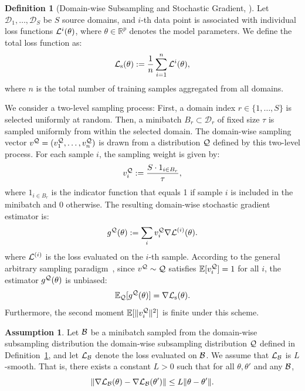 \documentclass{article}
\theoremstyle{plain}
\theoremstyle{definition}
\newtheorem{definition}[theorem]{Definition}
\newtheorem{assumption}[theorem]{Assumption}
\theoremstyle{remark}
\begin{document}
\begin{definition}[Domain-wise Subsampling and Stochastic Gradient, \cite{gower2019sgd_convergence, khaled2020better_sgd}]\label{def:subsampling}
Let \( \mathcal{D}_1, \ldots, \mathcal{D}_S \) be \( S \) source domains, and \(i\)-th data point is associated with individual loss functions \( {\mathcal{L}}^i(\theta) \), where \( \theta \in \mathbb{R}^p \) denotes the model parameters.  
We define the total loss function as:
\[
{\mathcal{L}}_{\text{s}}(\theta) := \frac{1}{n} \sum_{i=1}^n {\mathcal{L}}^i(\theta),
\]
where \( n \) is the total number of training samples aggregated from all domains. 

We consider a two-level sampling process:  
First, a domain index \( r \in \{1, \ldots, S\} \) is selected uniformly at random. Then, a minibatch \( B_r \subset \mathcal{D}_r \) of fixed size \( \tau \) is sampled uniformly from within the selected domain. The domain-wise sampling vector \( v^{\mathcal{Q}} = (v^{\mathcal{Q}}_1, \dots, v^{\mathcal{Q}}_n) \) is drawn from a distribution \( {\mathcal{Q}} \) defined by this two-level process. For each sample \( i \), the sampling weight is given by:
\[
v^{{\mathcal{Q}}}_i := \frac{S \cdot 1_{i \in B_r}}{\tau},
\]
where \( 1_{i \in B_r} \) is the indicator function that equals 1 if sample \( i \) is included in the minibatch and 0 otherwise. The resulting domain-wise stochastic gradient estimator is:
\[
g^{{\mathcal{Q}}}(\theta) := \sum_i v^{\mathcal{Q}}_i \nabla {\mathcal{L}}^{(i)}(\theta).
\]
where ${\mathcal{L}}^{(i)}$ is the loss evaluated on the $i$-th sample. According to the general arbitrary sampling paradigm~\cite{gower2019sgd_convergence}, since \( v^{\mathcal{Q}} \sim {\mathcal{Q}} \) satisfies \( \mathbb{E}[v^{\mathcal{Q}}_i] = 1 \) for all \( i \), the estimator \( g^{{\mathcal{Q}}}(\theta) \) is unbiased:
\[
\mathbb{E}_{\mathcal{Q}}[g^{{\mathcal{Q}}}(\theta)] = \nabla {\mathcal{L}}_{\text{s}}(\theta).
\]
Furthermore, the second moment \( \mathbb{E}[\|v^{\mathcal{Q}}_i\|^2] \) is finite under this scheme.
\end{definition}


\begin{assumption}\label{ass:smoothness}
Let ${\mathcal{B}}$ be a minibatch sampled from the domain-wise subsampling distribution the domain-wise subsampling distribution ${\mathcal{Q}}$ defined in Definition~\ref{def:subsampling}, and let ${\mathcal{L}}_{\mathcal{B}}$ denote the loss evaluated on ${\mathcal{B}}$. We assume that ${\mathcal{L}}_{\mathcal{B}}$ is $L$-smooth. That is, there exists a constant $L > 0$ such that for all $\theta, \theta' $ and any ${\mathcal{B}}$, 
\begin{equation}
    \lVert \nabla {\mathcal{L}}_{\mathcal{B}}(\theta) - \nabla {\mathcal{L}}_{\mathcal{B}}(\theta') \rVert \leq L \lVert \theta - \theta' \rVert. \label{Eq:L-smooth_bound_1}
\end{equation}
\end{assumption}
\end{document}

